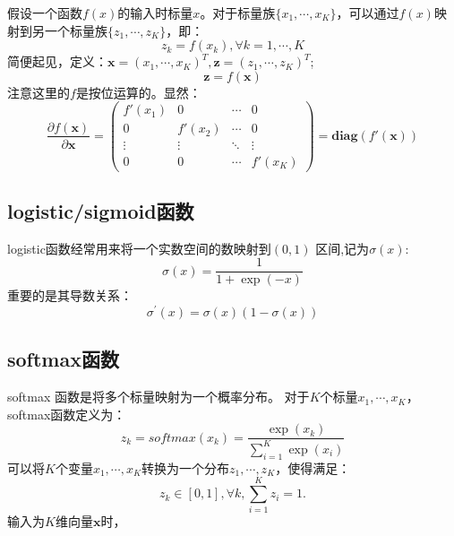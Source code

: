 \documentclass[11pt,fleqn, UTF8]{ctexbook} %
\begin{document}
假设一个函数$f(x)$的输入时标量$x$。对于标量族$\{x_1,\cdots,x_K\}$，可以通过$f(x)$映射到另一个标量族$\{z_1,\cdots,z_K\}$，即：
\begin{equation}\label{2.17}
  z_k=f(x_k),\forall k=1,\cdots,K
\end{equation}
简便起见，定义：$\boldsymbol{x}=(x_1,\cdots,x_K)^T,\boldsymbol{z}=(z_1,\cdots,z_K)^T$;
\begin{equation}\label{2.18}
  \boldsymbol{z}=f(\boldsymbol{x})
\end{equation}
注意这里的$f$是按位运算的。显然：
\begin{equation}\label{2.19}
  \frac{\partial f(\boldsymbol{x})}{\partial \boldsymbol{x}}=\begin{pmatrix}
  f'(x_1) & 0 & \cdots & 0 \\
  0 & f'(x_2) & \cdots & 0 \\
  \vdots  & \vdots  & \ddots & \vdots  \\
  0 & 0 & \cdots & f'(x_K)
 \end{pmatrix}=\boldsymbol{diag}(f'(\boldsymbol{x}))
\end{equation}

\subsection{logistic/sigmoid函数}
logistic函数经常用来将一个实数空间的数映射到$(0, 1)$ 区间,记为$\sigma(x)$:
\begin{equation}\label{2.20}
  \sigma(x)=\frac{1}{1+\exp(-x)}
\end{equation}
重要的是其导数关系：
\begin{equation}\label{2.21}
  \sigma^{\prime}(x)=\sigma(x)(1-\sigma(x))
\end{equation}
\subsection{softmax函数}
softmax 函数是将多个标量映射为一个概率分布。
对于$K$个标量$x_1,\cdots, x_K$，softmax函数定义为：
\begin{equation}\label{2.22}
  z_k=softmax(x_k)=\frac{\exp(x_k)}{\sum_{i=1}^{K}\exp(x_i)}
\end{equation}
可以将$K$个变量$x_1,\cdots, x_K$转换为一个分布$z_1,\cdots, z_K$，使得满足：
\begin{equation}\label{2.23}
  z_k\in[0,1],\forall k,  \sum_{i=1}^{K}z_i=1.
\end{equation}
输入为$K$维向量$\boldsymbol{x}$时，
\end{document}
